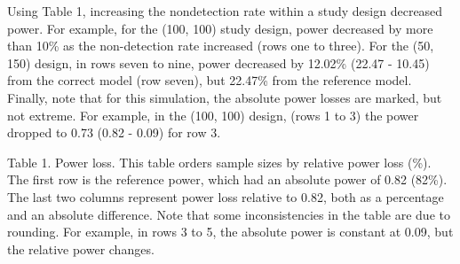 \documentclass[
]{article}
\begin{document}
Using Table 1, increasing the nondetection rate within a study design
decreased power. For example, for the (100, 100) study design, power
decreased by more than 10\% as the non-detection rate increased (rows
one to three). For the (50, 150) design, in rows seven to nine, power
decreased by 12.02\% (22.47 - 10.45) from the correct model (row seven),
but 22.47\% from the reference model. Finally, note that for this
simulation, the absolute power losses are marked, but not extreme. For
example, in the (100, 100) design, (rows 1 to 3) the power dropped to
0.73 (0.82 - 0.09) for row 3.

\pagebreak

Table 1. Power loss. This table orders sample sizes by relative power
loss (\%). The first row is the reference power, which had an absolute
power of 0.82 (82\%). The last two columns represent power loss relative
to 0.82, both as a percentage and an absolute difference. Note that some
inconsistencies in the table are due to rounding. For example, in rows 3
to 5, the absolute power is constant at 0.09, but the relative power
changes.
\end{document}
